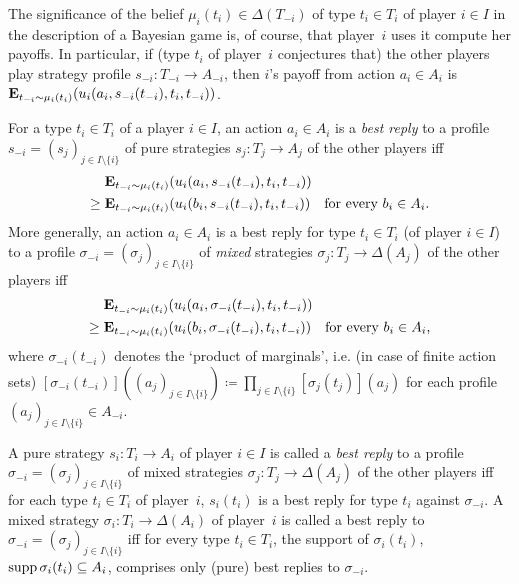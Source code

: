 \documentclass[11pt,letterpaper,reqno,oneside]{book}
\begin{document}
The significance of the belief $\mu_i(t_i) \in \Delta(T_{-i})$ of type $t_i \in T_i$ of player $i \in I$ in the description of a Bayesian game is, of course, that player~$i$ uses it compute her payoffs. In particular, if (type $t_i$ of player~$i$ conjectures that) the other players play strategy profile $s_{-i} : T_{-i} \to A_{-i}$, then $i$'s payoff from action $a_i \in A_i$ is $\E_{t_{-i} \sim \mu_i(t_i)} \left( u_i(a_i,s_{-i}(t_{-i}),t_i,t_{-i}) \right)$.

For a type $t_i \in T_i$ of a player $i \in I$, an action $a_i \in A_i$ is a \emph{best reply} to a profile $s_{-i} = (s_j)_{j \in I \setminus \{i\}}$ of pure strategies $s_j : T_j \to A_j$ of the other players iff
%
\begin{align*}
	{}&\E_{t_{-i} \sim \mu_i(t_i)} \left( u_i(a_i,s_{-i}(t_{-i}),t_i,t_{-i}) \right)
	\\
	\geq{} &\E_{t_{-i} \sim \mu_i(t_i)} \left( u_i(b_i,s_{-i}(t_{-i}),t_i,t_{-i}) \right)
	\quad \text{for every $b_i \in A_i$.}
\end{align*}
%
More generally, an action $a_i \in A_i$ is a best reply for type $t_i \in T_i$ (of player $i \in I$) to a profile $\sigma_{-i} = (\sigma_j)_{j \in I \setminus \{i\}}$ of \emph{mixed} strategies $\sigma_j : T_j \to \Delta(A_j)$ of the other players iff
%
\begin{align*}
	{}&\E_{t_{-i} \sim \mu_i(t_i)} \left( u_i(a_i,\sigma_{-i}(t_{-i}),t_i,t_{-i}) \right)
	\\
	\geq{} &\E_{t_{-i} \sim \mu_i(t_i)} \left( u_i(b_i,\sigma_{-i}(t_{-i}),t_i,t_{-i}) \right)
	\quad \text{for every $b_i \in A_i$,}
\end{align*}
%
where $\sigma_{-i}(t_{-i})$ denotes the `product of marginals', i.e. (in case of finite action sets) $[\sigma_{-i}(t_{-i})]((a_j)_{j \in I \setminus \{i\}}) \coloneqq \prod_{j \in I \setminus \{i\}} [\sigma_j(t_j)](a_j)$ for each profile $(a_j)_{j \in I \setminus \{i\}} \in A_{-i}$.

A pure strategy $s_i : T_i \to A_i$ of player $i \in I$ is called a \emph{best reply} to a profile $\sigma_{-i} = (\sigma_j)_{j \in I \setminus \{i\}}$ of mixed strategies $\sigma_j : T_j \to \Delta(A_j)$ of the other players iff for each type $t_i \in T_i$ of player~$i$, $s_i(t_i)$ is a best reply for type $t_i$ against $\sigma_{-i}$. A mixed strategy $\sigma_i : T_i \to \Delta(A_i)$ of player~$i$ is called a best reply to $\sigma_{-i} = (\sigma_j)_{j \in I \setminus \{i\}}$ iff for every type $t_i \in T_i$, the support of $\sigma_i(t_i)$, $\operatorname*{supp} \sigma_i(t_i) \subseteq A_i$, comprises only (pure) best replies to $\sigma_{-i}$.
\end{document}
